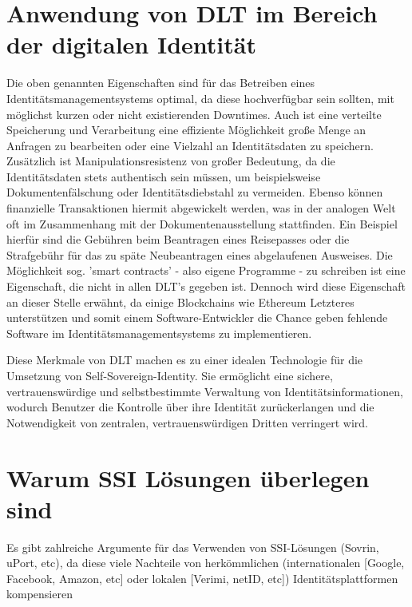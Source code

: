 \section{Anwendung von DLT im Bereich der digitalen Identität}
Die oben genannten Eigenschaften sind für das Betreiben eines Identitätsmanagementsystems optimal, da diese hochverfügbar sein sollten, mit möglichst kurzen oder nicht existierenden Downtimes. Auch ist eine verteilte Speicherung und Verarbeitung eine effiziente Möglichkeit große Menge an Anfragen zu bearbeiten oder eine Vielzahl an Identitätsdaten zu speichern. Zusätzlich ist Manipulationsresistenz von großer Bedeutung, da die Identitätsdaten stets authentisch sein müssen, um beispielsweise Dokumentenfälschung oder Identitätsdiebstahl zu vermeiden. Ebenso können finanzielle Transaktionen hiermit abgewickelt werden, was in der analogen Welt oft im Zusammenhang mit der Dokumentenausstellung stattfinden. Ein Beispiel hierfür sind die Gebühren beim Beantragen eines Reisepasses oder die Strafgebühr für das zu späte Neubeantragen eines abgelaufenen Ausweises.
Die Möglichkeit sog. 'smart contracts' - also eigene Programme - zu schreiben ist eine Eigenschaft, die nicht in allen DLT's gegeben ist. Dennoch wird diese Eigenschaft an dieser Stelle erwähnt, da einige Blockchains wie Ethereum Letzteres unterstützen und somit einem Software-Entwickler die Chance geben fehlende Software im Identitätsmanagementsystems zu implementieren.

Diese Merkmale von DLT machen es zu einer idealen Technologie für die Umsetzung von Self-Sovereign-Identity. Sie ermöglicht eine sichere, vertrauenswürdige und selbstbestimmte Verwaltung von Identitätsinformationen, wodurch Benutzer die Kontrolle über ihre Identität zurückerlangen und die Notwendigkeit von zentralen, vertrauenswürdigen Dritten verringert wird.

\section{Warum SSI Lösungen überlegen sind}
Es gibt zahlreiche Argumente für das Verwenden von SSI-Lösungen (Sovrin, uPort, etc), da diese viele Nachteile von herkömmlichen (internationalen [Google, Facebook, Amazon, etc] oder lokalen [Verimi, netID, etc]) Identitätsplattformen kompensieren \cite{ID28}

